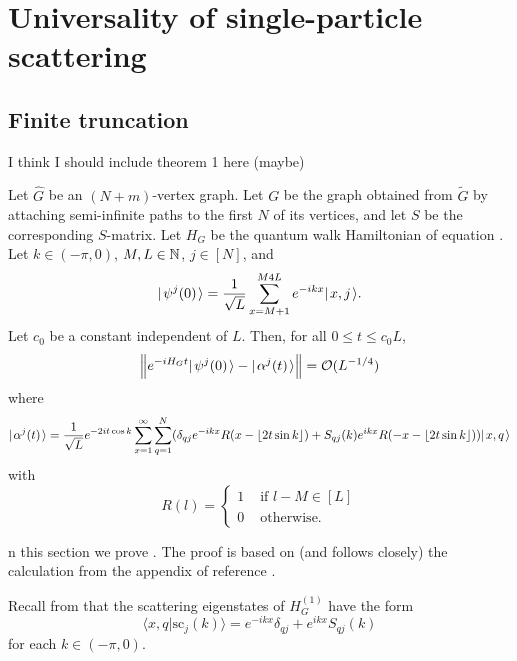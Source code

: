 \documentclass[../thesis-main/thesis-main]{subfiles}
\begin{document}
\chapter{Universality of single-particle scattering}

\section{Finite truncation}

I think I should include theorem 1 here (maybe)

\begin{theorem} Let $\widehat{G}$ be an $(N+m)$-vertex graph.  Let $G$ be the graph obtained from $\widetilde{G}$ by attaching semi-infinite paths to the first $N$ of its vertices, and let $S$ be the corresponding $S$-matrix.  Let $H_G$ be the quantum walk Hamiltonian of equation . Let $k\in (-\pi,0)$, $M,L\in \mathbb{N}$, $j\in [N]$, and 
\begin{equation}
  |\mspace{2mu} \psi^j(0) \mspace{2mu} \rangle = \frac{1}{\sqrt{L}} \sum_{x=M+1}^{M4L} e^{-i k x} |\mspace{2mu} x,j \mspace{2mu} \rangle.
\end{equation}
Let $c_0$ be a constant independent of $L$.  Then, for all $0 \leq t \leq c_0 L$,
\begin{equation}
   \Big\|e^{-i H_G t}|\mspace{2mu} \psi^j(0) \mspace{2mu} \rangle - |\mspace{2mu} \alpha^j(t) \mspace{2mu} \rangle\Big\| = \mathcal{O}(L^{-1/4})
\end{equation}
where
\begin{equation}
  |\mspace{2mu} \alpha^j(t) \mspace{2mu} \rangle = \frac{1}{\sqrt{L}} e^{-2 i t \cos k} \sum_{x=1}^\infty \sum_{q=1}^N (\delta_{qj} e^{-ikx} R(x- \lfloor 2t \sin k\rfloor ) + S_{qj}(k) e^{ikx} R(-x - \lfloor 2t \sin k\rfloor ) ) |\mspace{2mu} x,q \mspace{2mu} \rangle
\end{equation}
with
\begin{equation}
  R(l) = \begin{cases} 1 & \text{ if } l- M \in [L]\\
    0 & \text{ otherwise.}
    \end{cases}
\end{equation}
\end{theorem}
n this section we prove . The proof is based on (and follows closely) the calculation from the appendix of reference \cite{FGG08}.

Recall from  that the scattering eigenstates of $H_{G}^{(1)}$ have the
form
\[
\langle x,q|\text{sc}_{j}(k)\rangle=e^{-ikx}\delta_{qj}+e^{ikx}S_{qj}(k)\]
 for each $k\in(-\pi,0)$. 
\end{document}
